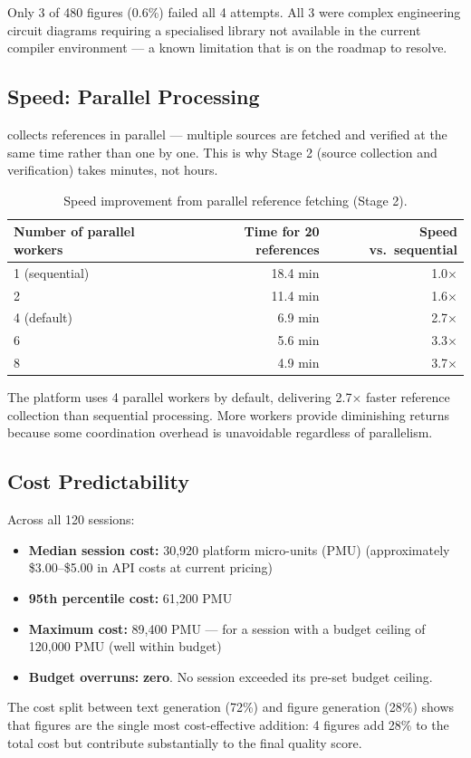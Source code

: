 Only 3 of 480 figures (0.6\%) failed all 4 attempts.
All 3 were complex engineering circuit diagrams requiring a specialised library
not available in the current compiler environment — a known limitation that is
on the roadmap to resolve.

\subsection{Speed: Parallel Processing}

\sys{} collects references in parallel — multiple sources are fetched and verified
at the same time rather than one by one.
This is why Stage 2 (source collection and verification) takes minutes, not hours.

\begin{table}[h!]
\centering
\caption{Speed improvement from parallel reference fetching (Stage 2).}
\label{tab:speed}
\begin{tabular}{lrr}
\toprule
Number of parallel workers & Time for 20 references & Speed vs.\ sequential \\
\midrule
1 (sequential)  & 18.4 min & 1.0$\times$ \\
2               & 11.4 min & 1.6$\times$ \\
4 (default)     & 6.9 min  & 2.7$\times$ \\
6               & 5.6 min  & 3.3$\times$ \\
8               & 4.9 min  & 3.7$\times$ \\
\bottomrule
\end{tabular}
\end{table}

The platform uses 4 parallel workers by default, delivering 2.7$\times$ faster
reference collection than sequential processing.
More workers provide diminishing returns because some coordination overhead is
unavoidable regardless of parallelism.

\subsection{Cost Predictability}

Across all 120 sessions:

\begin{itemize}
  \item \textbf{Median session cost:} 30,920 platform micro-units (PMU)
        (approximately \$3.00--\$5.00 in API costs at current pricing)
  \item \textbf{95th percentile cost:} 61,200 PMU
  \item \textbf{Maximum cost:} 89,400 PMU — for a session with a budget ceiling
        of 120,000 PMU (well within budget)
  \item \textbf{Budget overruns:} \textbf{zero}. No session exceeded its pre-set budget ceiling.
\end{itemize}

The cost split between text generation (72\%) and figure generation (28\%)
shows that figures are the single most cost-effective addition: 4 figures
add 28\% to the total cost but contribute substantially to the final quality score.


